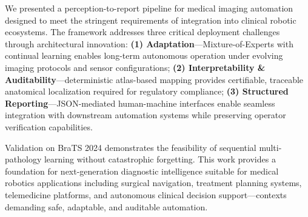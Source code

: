 \documentclass[conference]{IEEEtran}
\begin{document}
We presented a perception-to-report pipeline for medical imaging automation designed to meet the stringent requirements of integration into clinical robotic ecosystems. The framework addresses three critical deployment challenges through architectural innovation: \textbf{(1) Adaptation}—Mixture-of-Experts with continual learning enables long-term autonomous operation under evolving imaging protocols and sensor configurations; \textbf{(2) Interpretability \& Auditability}—deterministic atlas-based mapping provides certifiable, traceable anatomical localization required for regulatory compliance; \textbf{(3) Structured Reporting}—JSON-mediated human-machine interfaces enable seamless integration with downstream automation systems while preserving operator verification capabilities.

Validation on BraTS 2024 demonstrates the feasibility of sequential multi-pathology learning without catastrophic forgetting. This work provides a foundation for next-generation diagnostic intelligence suitable for medical robotics applications including surgical navigation, treatment planning systems, telemedicine platforms, and autonomous clinical decision support—contexts demanding safe, adaptable, and auditable automation.



\end{document}
